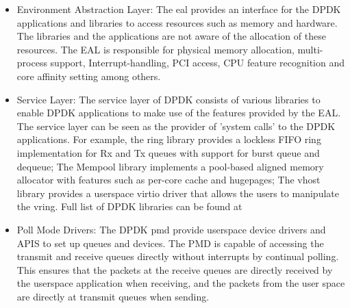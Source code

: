 \begin{itemize}
 \item Environment Abstraction Layer: The \ac{eal} provides an interface for the DPDK applications and libraries to access resources such as memory and hardware. The libraries and the applications are not aware of the allocation of these resources. The EAL is responsible for physical memory allocation, multi-process support, Interrupt-handling, PCI access, CPU feature recognition and core affinity setting among others.
 \item Service Layer: The service layer of DPDK consists of various libraries to enable DPDK applications to make use of the features provided by the EAL. The service layer can be seen as the provider of 'system calls' to the DPDK applications. For example, the ring library provides a lockless FIFO ring implementation for Rx and Tx queues with support for burst queue and dequeue; The Mempool library implements a pool-based aligned memory allocator with features such as per-core cache and hugepages; The vhost library provides a userspace virtio driver that allows the users to manipulate the vring. Full list of DPDK libraries can be found at \cite{DPDK}
 \item Poll Mode Drivers: The DPDK \ac{pmd} provide userspace device drivers and APIS to set up queues and devices. The PMD is capable of accessing the transmit and receive queues directly without interrupts by continual polling. This ensures that the packets at the receive queues are directly received by the userspace application when receiving, and the packets from the user space are directly at transmit queues when sending.
\end{itemize}

